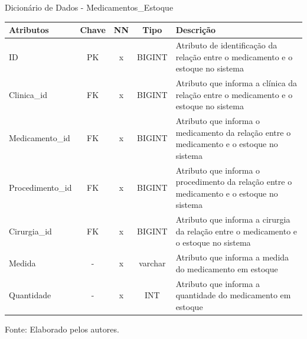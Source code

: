 \documentclass[
    12pt,               %
    openright,          %
    oneside,
    a4paper,            %
    BIBLATEX,           %
    TODO,               %
    english,            %
    brazil              %
    ]{ifsp-spo-inf-ctds}
\begin{document}
              \begin{center}
                \begin{quadro}[H]
                \centering
                        \caption{Dicionário de Dados - Medicamentos\_Estoque}
                          \begin{tabulary}{1.0\textwidth}{|p{9em}|c|c|c|p{19em}|}
                    \hline
                    Atributos & Chave & NN & Tipo & Descrição\\
                    \hline
                    ID & PK & x & BIGINT & Atributo de identificação da relação entre o medicamento e o estoque no sistema \\
                    \hline
                    Clinica\_id & FK & x & BIGINT & Atributo que informa a clínica da relação entre o medicamento e o estoque no sistema\\
                    \hline
                    Medicamento\_id & FK & x & BIGINT & Atributo que informa o medicamento da relação entre o medicamento e o estoque no sistema\\
                    \hline
                    Procedimento\_id & FK & x & BIGINT & Atributo que informa o procedimento da relação entre o medicamento e o estoque no sistema\\
                    \hline
                    Cirurgia\_id & FK & x & BIGINT & Atributo que informa a cirurgia da relação entre o medicamento e o estoque no sistema\\
                    \hline
                    Medida & - & x & varchar & Atributo que informa a medida do medicamento em estoque\\
                    \hline
                    Quantidade & - & x & INT & Atributo que informa a quantidade do medicamento em estoque\\
                    \hline
                    \end{tabulary}
                         
                        \label{qd: md-medicamento-estoque}
                        \centering
                {\footnotesize Fonte: Elaborado pelos autores.}
                      \end{quadro}
                    \end{center}
                    
\end{document}
